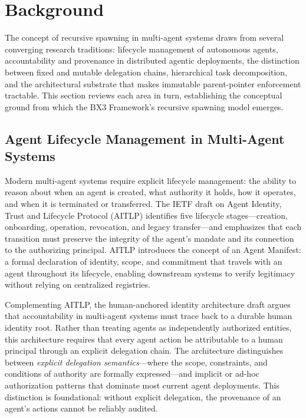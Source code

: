 \section{Background}

The concept of recursive spawning in multi-agent systems draws from several converging research traditions: lifecycle management of autonomous agents, accountability and provenance in distributed agentic deployments, the distinction between fixed and mutable delegation chains, hierarchical task decomposition, and the architectural substrate that makes immutable parent-pointer enforcement tractable. This section reviews each area in turn, establishing the conceptual ground from which the BX3 Framework's recursive spawning model emerges.

\subsection{Agent Lifecycle Management in Multi-Agent Systems}

Modern multi-agent systems require explicit lifecycle management: the ability to reason about when an agent is created, what authority it holds, how it operates, and when it is terminated or transferred. The IETF draft on Agent Identity, Trust and Lifecycle Protocol (AITLP) \cite{draft-larsson-aitlp} identifies five lifecycle stages---creation, onboarding, operation, revocation, and legacy transfer---and emphasizes that each transition must preserve the integrity of the agent's mandate and its connection to the authorizing principal. AITLP introduces the concept of an Agent Manifest: a formal declaration of identity, scope, and commitment that travels with an agent throughout its lifecycle, enabling downstream systems to verify legitimacy without relying on centralized registries.

Complementing AITLP, the human-anchored identity architecture draft \cite{draft-beyer-agent-identity-architecture} argues that accountability in multi-agent systems must trace back to a durable human identity root. Rather than treating agents as independently authorized entities, this architecture requires that every agent action be attributable to a human principal through an explicit delegation chain. The architecture distinguishes between \emph{explicit delegation semantics}---where the scope, constraints, and conditions of authority are formally expressed---and implicit or ad-hoc authorization patterns that dominate most current agent deployments. This distinction is foundational: without explicit delegation, the provenance of an agent's actions cannot be reliably audited.

